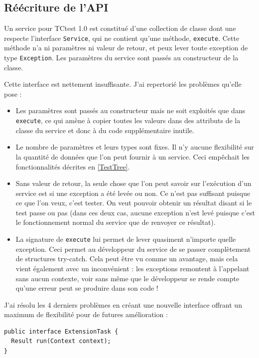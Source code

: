 \subsection{Réécriture de l'API}
\label{NewAPI}

Un service pour TCtest 1.0 est constitué d'une collection de classe dont une 
respecte l'interface \verb|Service|, qui ne contient qu'une méthode, 
\verb|execute|. Cette méthode n'a ni paramètres ni valeur de retour, et peux
lever toute exception de type \verb|Exception|.
Les paramètres du service sont passés au constructeur de la classe.

Cette interface est nettement insuffisante. J'ai repertorié les problèmes 
qu'elle pose :
\begin{itemize}
	\item{Les paramètres sont passés au constructeur mais ne soit exploités 
	que dans \verb|execute|, ce qui amène à copier toutes les valeurs dans des 
	attributs de la classe du service et donc à du code supplémentaire inutile.}
	\item{Le nombre de paramètres et leurs types sont fixes. Il n'y aucune 
	flexibilité sur la quantité de données que l'on peut fournir à un service. 
	Ceci empêchait les fonctionnalités décrites en \ref{TestTree}.}
	\item{Sans valeur de retour, la seule chose que l'on peut savoir sur 
	l'exécution d'un service est si une exception a été levée ou non. Ce n'est 
	pas suffisant puisque ce que l'on veux, c'est tester. On veut pouvoir 
	obtenir un résultat disant si le test passe ou pas (dans ces deux cas, 
	aucune exception n'est levé puisque c'est le fonctionnement normal du 
	service que de renvoyer ce résultat).}
	\item{La signature de \verb|execute| lui permet de lever quasiment 
	n'importe quelle exception. Ceci permet au développeur du service de se 
	passer complètement de structures try-catch. Cela peut être vu comme un 
	avantage, mais cela vient également avec un inconvénient : les exceptions 
	remontent à l'appelant sans aucun contexte, voir sans même que le 
	développeur se rende compte qu'une erreur peut se produire dans son code !}
\end{itemize}

J'ai résolu les 4 derniers problèmes en créant une nouvelle interface offrant un 
maximum de flexibilité pour de futures amélioration :

\begin{verbatim}
public interface ExtensionTask {
  Result run(Context context);
}
\end{verbatim}

